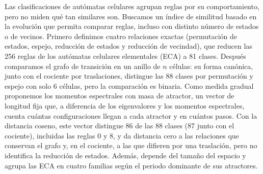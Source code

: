 Las clasificaciones de autómatas celulares agrupan reglas por su comportamiento, pero no miden qué tan similares son. Buscamos un índice de similitud basado en la evolución que permita comparar reglas, incluso con distinto número de estados o de vecinos. Primero definimos cuatro relaciones exactas (permutación de estados, espejo, reducción de estados y reducción de vecindad), que reducen las 256 reglas de los autómatas celulares elementales (ECA) a 81 clases. Después comparamos el grafo de transición en un anillo de $n$ células: su forma canónica, junto con el cociente por traslaciones, distingue las 88 clases por permutación y espejo con solo 6 células, pero la comparación es binaria. Como medida gradual proponemos los momentos espectrales con masa de atractor, un vector de longitud fija que, a diferencia de los eigenvalores y los momentos espectrales, cuenta cuántas configuraciones llegan a cada atractor y en cuántos pasos. Con la distancia coseno, este vector distingue 86 de las 88 clases (87 junto con el cociente), incluidas las reglas 0 y 8, y da distancia cero a las relaciones que conservan el grafo y, en el cociente, a las que difieren por una traslación, pero no identifica la reducción de estados. Además, depende del tamaño del espacio y agrupa las ECA en cuatro familias según el periodo dominante de sus atractores.
